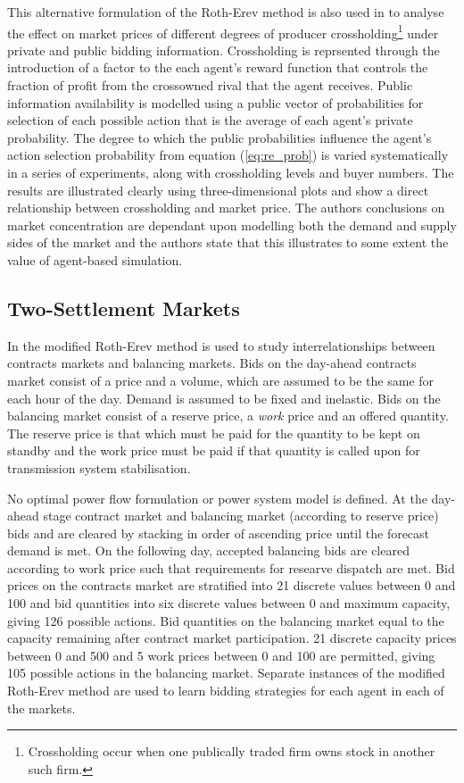 This alternative formulation of the Roth-Erev method is also used in
\cite{micola:08b} to analyse the effect on market prices of different degrees
of producer crossholding\footnote{Crossholding occur when one publically
traded firm owns stock in another such firm.} under private and public bidding
information.  Crossholding is reprsented through the introduction of a factor
to the each agent's reward function that controls the fraction of profit from
the crossowned rival that the agent receives.  Public information availability
is modelled using a public vector of probabilities for selection of each
possible action that is the average of each agent's private probability.  The
degree to which the public probabilities influence the agent's action
selection probability from equation (\ref{eq:re_prob}) is varied
systematically in a series of experiments, along with crossholding levels and
buyer numbers.  The results are illustrated clearly using three-dimensional
plots and show a direct relationship between crossholding and market price.
The authors conclusions on market concentration are dependant upon modelling
both the demand and supply sides of the market and the authors state that this
illustrates to some extent the value of agent-based simulation.

\subsection{Two-Settlement Markets}
In \cite{weidlich:06} the modified Roth-Erev method is used to study
interrelationships between contracts markets and balancing markets.  Bids on the
day-ahead contracts market consist of a price and a volume, which are assumed to
be the same for each hour of the day.  Demand is assumed to be fixed and
inelastic.  Bids on the balancing market consist of a reserve price, a
\textit{work} price and an offered quantity.  The reserve price is that which
must be paid for the quantity to be kept on standby and the work price must be
paid if that quantity is called upon for transmission system stabilisation.

No optimal power flow formulation or power system model is defined.  At the
day-ahead stage contract market and balancing market (according to reserve
price) bids and are cleared by stacking in order of ascending price until the
forecast demand is met.  On the following day, accepted balancing bids are
cleared according to work price such that requirements for researve dispatch
are met.  Bid prices on the contracts market are stratified into 21 discrete
values between 0 and 100 and bid quantities into six discrete values between 0
and maximum capacity, giving 126 possible actions.  Bid quantities on the
balancing market equal to the capacity remaining after contract market
participation.  21 discrete capacity prices between 0 and 500 and 5 work prices
between 0 and 100 are permitted, giving 105 possible actions in the balancing
market.  Separate instances of the modified Roth-Erev method are used to learn
bidding strategies for each agent in each of the markets.

